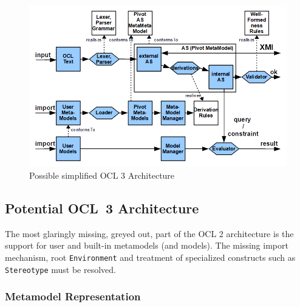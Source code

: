 \documentclass{jot}
\begin{document}
\begin{figure}
	\begin{center}
		\includegraphics[width=4.5in]{OCL3Architecture.png}
	\end{center}
	\caption{Possible simplified OCL 3 Architecture}
	\label{fig:OCL3Architecture}
\end{figure}

\subsection{Potential OCL~3 Architecture}

The most glaringly missing, greyed out, part of the OCL 2 architecture is the support for user and built-in metamodels (and models). The missing import mechanism, root \verb$Environment$ and treatment of specialized constructs such as \verb$Stereotype$ must be resolved.

\subsubsection{Metamodel Representation}


\end{document}
